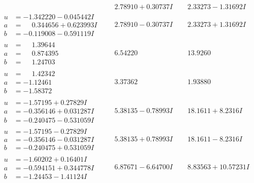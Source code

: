 \documentclass[1p]{elsarticle_modified}
\theoremstyle{definition}
\begin{document}
$$\begin{array}{c|c|c}
 & \phantom{-}2.78910 + 0.30737 I & \phantom{-}2.33273 - 1.31692 I \\ \hline\begin{aligned}
u &= -1.342220 - 0.045442 I \\
a &= \phantom{-}0.344656 + 0.623993 I \\
b &= -0.119008 - 0.591119 I\end{aligned}
 & \phantom{-}2.78910 - 0.30737 I & \phantom{-}2.33273 + 1.31692 I \\ \hline\begin{aligned}
u &= \phantom{-}1.39644\phantom{ +0.000000I} \\
a &= \phantom{-}0.874395\phantom{ +0.000000I} \\
b &= \phantom{-}1.24703\phantom{ +0.000000I}\end{aligned}
 & \phantom{-}6.54220\phantom{ +0.000000I} & \phantom{-}13.9260\phantom{ +0.000000I} \\ \hline\begin{aligned}
u &= \phantom{-}1.42342\phantom{ +0.000000I} \\
a &= -1.12461\phantom{ +0.000000I} \\
b &= -1.58372\phantom{ +0.000000I}\end{aligned}
 & \phantom{-}3.37362\phantom{ +0.000000I} & \phantom{-}1.93880\phantom{ +0.000000I} \\ \hline\begin{aligned}
u &= -1.57195 + 0.27829 I \\
a &= -0.356146 + 0.031287 I \\
b &= -0.240475 - 0.531059 I\end{aligned}
 & \phantom{-}5.38135 - 0.78993 I & \phantom{-}18.1611 + 8.2316 I \\ \hline\begin{aligned}
u &= -1.57195 - 0.27829 I \\
a &= -0.356146 - 0.031287 I \\
b &= -0.240475 + 0.531059 I\end{aligned}
 & \phantom{-}5.38135 + 0.78993 I & \phantom{-}18.1611 - 8.2316 I \\ \hline\begin{aligned}
u &= -1.60202 + 0.16401 I \\
a &= -0.594151 + 0.344778 I \\
b &= -1.24453 - 1.41124 I\end{aligned}
 & \phantom{-}6.87671 - 6.64700 I & \phantom{-}8.83563 + 10.57231 I \\ \hline\begin{aligned}

\end{aligned}
\end{array}$$
\end{document}
